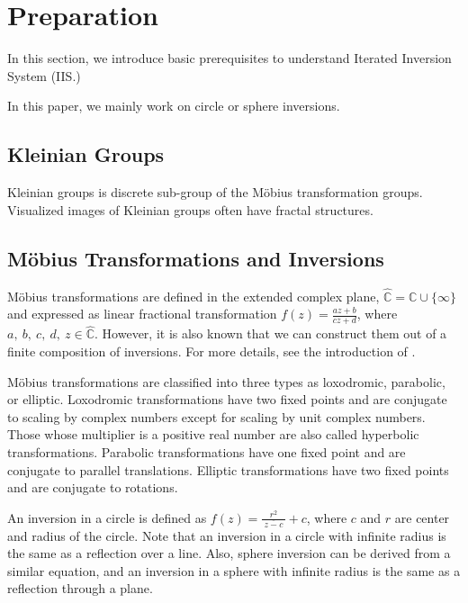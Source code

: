 
\section{Preparation}

In this section, we introduce basic prerequisites to understand
Iterated Inversion System (IIS.)

In this paper, we mainly work on circle or sphere inversions.

\subsection{Kleinian Groups}

Kleinian groups is discrete sub-group of the M\"obius transformation
groups. Visualized images of Kleinian groups often have fractal structures.

\subsection{M\"obius Transformations and Inversions}

M\"obius transformations are defined in the extended complex plane,
$\hat{\mathbb{C}} = \mathbb{C} \cup \{\infty\}$ and expressed as linear
fractional transformation
$f(z)=\frac{az + b}{cz + d}$, where $a,~b,~c,~d,~z \in \hat{\mathbb{C}}$.
However, it is also known that we can construct them out of a finite
composition of inversions. For more details, see the introduction of \cite{mobius}.

M\"obius transformations are classified into three types as loxodromic,
parabolic, or elliptic.
Loxodromic transformations have two fixed points and are conjugate to
scaling by complex numbers except for scaling by unit complex numbers.
Those whose multiplier is a positive real number
are also called hyperbolic transformations.
Parabolic transformations have one fixed point and are conjugate to
parallel translations.
Elliptic transformations have two fixed points and are conjugate to rotations.

An inversion in a circle
is defined as $f(z) = \frac{r^2}{~\overline{z - c}~} + c$, where $c$ and
$r$ are center and radius of the circle.
Note that an inversion in a circle with infinite radius is the same as
a reflection over a line.
Also, sphere inversion can be derived from a similar equation, and an inversion
in a sphere with infinite radius is the same as
a reflection through a plane.

